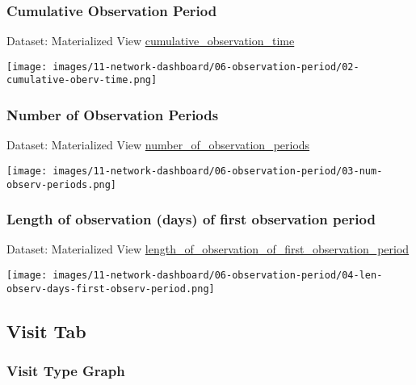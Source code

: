 \documentclass[
]{book}
\begin{document}
\hypertarget{cumulative-observation-period}{%
\subsubsection*{Cumulative Observation Period}\label{cumulative-observation-period}}

Dataset: Materialized View \href{materialized-views-1.html\#cumulative_observation_time}{cumulative\_observation\_time}

\texttt{[image: images/11-network-dashboard/06-observation-period/02-cumulative-oberv-time.png]}

\hypertarget{number-of-observation-periods}{%
\subsubsection*{Number of Observation Periods}\label{number-of-observation-periods}}

Dataset: Materialized View \href{materialized-views-1.html\#number_of_observation_periods}{number\_of\_observation\_periods}

\texttt{[image: images/11-network-dashboard/06-observation-period/03-num-observ-periods.png]}

\hypertarget{length-of-observation-days-of-first-observation-period}{%
\subsubsection*{Length of observation (days) of first observation period}\label{length-of-observation-days-of-first-observation-period}}

Dataset: Materialized View \href{materialized-views-1.html\#length_of_observation_of_first_observation_period}{length\_of\_observation\_of\_first\_observation\_period}

\texttt{[image: images/11-network-dashboard/06-observation-period/04-len-observ-days-first-observ-period.png]}

\hypertarget{visit-tab}{%
\subsection*{Visit Tab}\label{visit-tab}}

\hypertarget{visit-type-graph}{%
\subsubsection*{Visit Type Graph}\label{visit-type-graph}}
\end{document}

